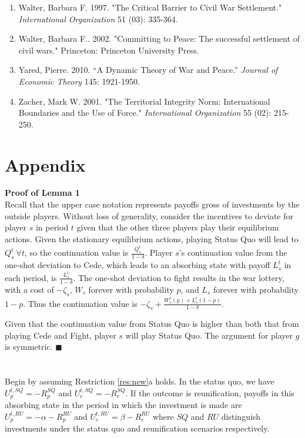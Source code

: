 \documentclass[11pt,letterpaper, notitlepage]{article}
\begin{document}
\begin{enumerate}[1.]
\item \hangindent=1cm Walter, Barbara F. 1997. "The Critical Barrier to Civil War Settlement." \emph {International Organization} 51 (03): 335-364.

\item \hangindent=1cm Walter, Barbara F.. 2002. "Committing to Peace: The successful settlement of civil wars." Princeton: Princeton University Press.


\item \hangindent=1cm Yared, Pierre. 2010. ``A Dynamic Theory of War and Peace.'' \emph{Journal of Economic Theory} 145: 1921-1950.

\item \hangindent=1cm Zacher, Mark W. 2001. "The Territorial Integrity Norm: International Boundaries and the Use of Force." \emph {International Organization} 55 (02): 215-250.

\end{enumerate}


\pagebreak
\appendix
\section{Appendix} 

{\bf Proof of Lemma 1} \\
Recall that the upper case notation represents payoffs gross of investments by the outside players. Without loss of generality, consider the incentives to deviate for player $s$ in period $t$ given that the other three players play their equilibrium actions. Given the stationary equilibrium actions, playing Status Quo will lead to $Q_s^t \ \forall t$, so the continuation value is $\frac{Q_s^t}{1-\delta}$. Player $s$'s continuation value from the one-shot deviation to Cede, which leads to an absorbing state with payoff $L_s^t$ in each period, is $\frac{L_s^t}{1-\delta}$. The one-shot deviation to fight results in the war lottery, with a cost of $-\zeta_s$, $W_s$ forever with probability $p$, and $L_s$ forever with probability $1-p$. Thus the continuation value is $-\zeta_s +\frac{W_s^t(p)+ L_s^t(1-p)}{1-\delta}$.

Given that the continuation value from Status Quo is higher than both that from playing Cede and Fight, player $s$ will play Status Quo. The argument for player $g$ is symmetric. \hfill $\blacksquare$
\\
\\
 \\
Begin by assuming Restriction \ref{res:new}a holds. In the status quo, we have $U_p^{t,SQ}= -R_p^{SQ}$ and $U_c^{t,SQ}= -R_c^{SQ}$. If the outcome is reunification, payoffs in this absorbing state in the period in which the investment is made are $U_p^{t,RU}= -\alpha -R_p^{RU}$ and $U_c^{t,RU}= \beta -R_c^{RU}$ where $SQ$ and $RU$ distinguish investments under the status quo and reunification scenarios respectively.
\end{document}
